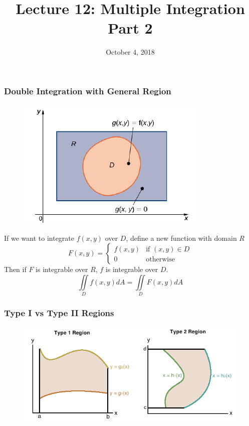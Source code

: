 \documentclass{beamer}
\title{Lecture 12: Multiple Integration Part 2}
\date{October 4, 2018}
\begin{document}
	
\frame{\titlepage}


\begin{frame}
\frametitle{Double Integration with General Region}
\begin{figure}
	\centering
	\includegraphics[height=.35\textheight]{DR.png}\\
	\hspace*{10pt}\hbox{}
\end{figure}
If we want to integrate $f(x,y)$ over $D$, define a new function with domain $R$
$$F(x,y) = \begin{cases}
f(x,y) & \mbox{if }(x,y)\in D\\
0 & \mbox{otherwise}
\end{cases}$$
Then if $F$ is integrable over $R$, $f$ is integrable over $D$.
$$\iint\limits_{D} f(x,y)dA = \iint\limits_{D} F(x,y)dA$$
\end{frame}

\begin{frame}
\frametitle{Type I vs Type II Regions}
\begin{figure}
	
		\includegraphics[width=.95\textwidth]{image001.png}
		\hspace*{10pt}\hbox{}
\end{figure}
\end{frame}
\end{document}
